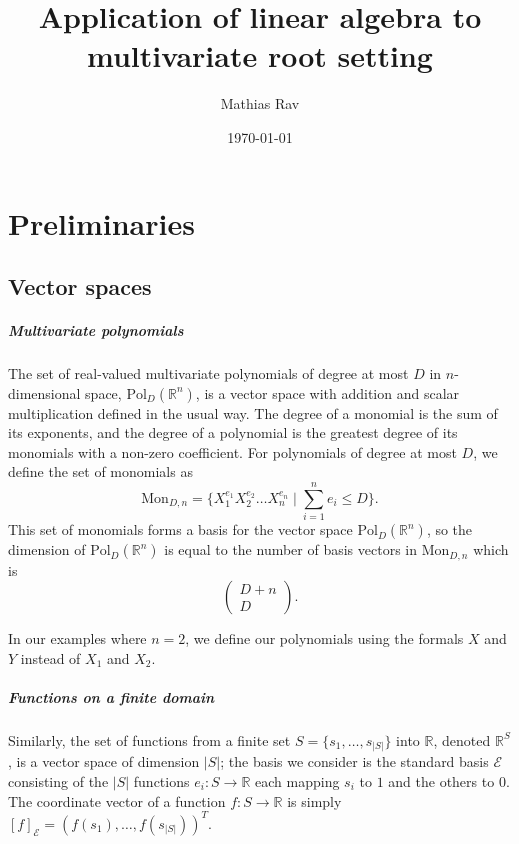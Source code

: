 \documentclass[oneside,a4paper]{memoir}
\newcommand{\reals}{\mathbb{R}}
\newcommand{\Pol}[2]{\mathrm{Pol}_#1(\reals^#2)}
\newcommand{\PolDn}{\Pol Dn}
\newcommand{\Mon}[2]{\mathrm{Mon}_{#1,#2}}
\newcommand{\MonDn}{\Mon Dn}
\newcommand{\StoR}{\reals^S}
\newcommand{\StandardBasis}{\mathcal{E}}
\newcommand{\T}{T}
\newcommand{\Ssz}{|S|}
\begin{document}
\title{Application of linear algebra to multivariate root setting}
\author{Mathias Rav}
\date{\today}
\maketitle

\chapter{Preliminaries}

\section{Vector spaces}

\paragraph{Multivariate polynomials}
The set of real-valued multivariate polynomials of degree at most $D$ in
$n$-dimensional space, $\PolDn$, is a vector space with addition and scalar
multiplication defined in the usual way.
The degree of a monomial is the sum of its exponents,
and the degree of a polynomial is the greatest degree of its monomials
with a non-zero coefficient.
For polynomials of degree at most $D$, we define the set of monomials as
\[\MonDn = \{X_1^{e_1} X_2^{e_2} \dots X_n^{e_n} \mid \sum_{i=1}^n e_i \leq D\}.\]
This set of monomials forms a basis for the vector space $\PolDn$,
so the dimension of $\PolDn$ is equal to the number of basis vectors in $\MonDn$ which is
\[\begin{pmatrix} D + n \\ D \end{pmatrix}.\]

In our examples where $n = 2$, we define our polynomials using the formals $X$
and $Y$ instead of $X_1$ and $X_2$.

\paragraph{Functions on a finite domain}
Similarly, the set of functions from a finite set
$S = \{s_1, \dots, s_{\Ssz}\}$ into $\reals$,
denoted $\StoR$, is a vector space of dimension $\Ssz$;
the basis we consider is the standard basis $\StandardBasis$
consisting of the $\Ssz$ functions $e_i : S \to \reals$
each mapping $s_i$ to $1$ and the others to $0$.
The coordinate vector of a function $f : S \to \reals$
is simply $[f]_{\StandardBasis} = ( f(s_1), \dots, f(s_{\Ssz}) )^\T$.
\end{document}
